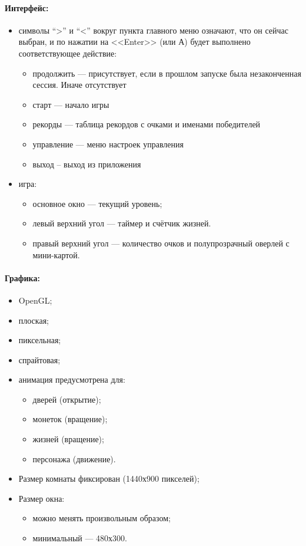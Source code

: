 \documentclass[12pt,a4paper,fullpage,titlepage]{article}
\begin{document}
\paragraph{Интерфейс:}
\begin{itemize}
	\item символы ``>'' и ``<'' вокруг пункта главного меню означают, что он сейчас выбран, и по нажатии на <<Enter>> (или А) будет выполнено соответствующее действие:
	\begin{itemize}
		\item продолжить --- присутствует, если в прошлом запуске была незаконченная сессия. Иначе отсутствует
		\item старт --- начало игры
		\item рекорды --- таблица рекордов с очками и именами победителей
		\item управление --- меню настроек управления
		\item выход -- выход из приложения\\
	\end{itemize}
	\item игра:
	\begin{itemize}
		\item основное окно --- текущий уровень;
		\item левый верхний угол --- таймер и счётчик жизней.
		\item правый верхний угол --- количество очков и полупрозрачный оверлей с мини-картой.
	\end{itemize}
\end{itemize}

\paragraph{Графика:}
\begin{itemize}
	\item OpenGL;
	\item плоская;
	\item пиксельная;
	\item спрайтовая;
	\item анимация предусмотрена для:
	\begin{itemize}
		\item дверей (открытие);
		\item монеток (вращение);
		\item жизней (вращение);
		\item персонажа (движение).
	\end{itemize}
	\item Размер комнаты фиксирован (1440х900 пикселей);
	\item Размер окна:
	\begin{itemize}
		\item можно менять произвольным образом;
		\item минимальный --- 480х300.
	\end{itemize}
\end{itemize}
\end{document}
